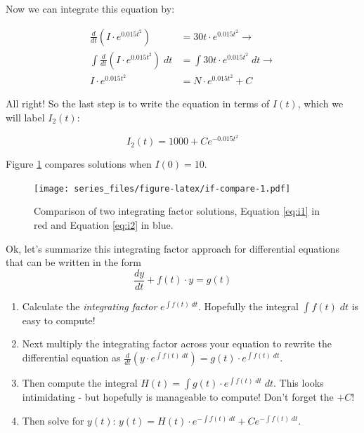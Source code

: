 \documentclass[
]{book}
\providecommand{\tightlist}{%
  \setlength{\itemsep}{0pt}\setlength{\parskip}{0pt}}
\theoremstyle{definition}
\theoremstyle{definition}
\theoremstyle{definition}
\theoremstyle{remark}
\begin{document}
Now we can integrate this equation by:

\begin{equation}
\begin{split}
\frac{d}{dt} \left( I \cdot e^{0.015 t^{2}} \right) &= 30 t \cdot e^{0.015 t^{2}}  \rightarrow \\
\int \frac{d}{dt} \left( I \cdot e^{0.015  t^{2}} \right) \; dt &= \int 30t \cdot e^{0.015 t^{2}}  \; dt \rightarrow \\
I \cdot e^{0.015 t^{2}} &= N \cdot e^{0.015 t^{2}} + C
\end{split}
\end{equation}

All right! So the last step is to write the equation in terms of \(I(t)\), which we will label \(I_{2}(t)\):

\begin{equation}
I_{2}(t) =  1000 + C e^{-0.015 t^{2}}  \label{eq:i2}
\end{equation}

Figure \ref{fig:if-compare} compares solutions when \(I(0)=10\).

\begin{figure}
\centering
\texttt{[image: series\_files/figure-latex/if-compare-1.pdf]}
\caption{\label{fig:if-compare}Comparison of two integrating factor solutions, Equation \eqref{eq:i1} in red and Equation \eqref{eq:i2} in blue.}
\end{figure}

Ok, let's summarize this integrating factor approach for differential equations that can be written in the form \[\frac{dy}{dt} + f(t) \cdot y = g(t)\]

\begin{enumerate}
\def\labelenumi{\arabic{enumi}.}
\tightlist
\item
  Calculate the \emph{integrating factor} \(\displaystyle e^{\int f(t) \; dt}\). Hopefully the integral \(\displaystyle \int f(t) \; dt\) is easy to compute!
\item
  Next multiply the integrating factor across your equation to rewrite the differential equation as \(\displaystyle \frac{d}{dt} \left( y \cdot e^{\int f(t) \; dt} \right) = g(t) \cdot e^{\int f(t) \; dt}\).
\item
  Then compute the integral \(\displaystyle H(t) = \int g(t) \cdot e^{\int f(t) \; dt} \; dt\). This looks intimidating - but hopefully is manageable to compute! Don't forget the \(+C\)!
\item
  Then solve for \(y(t)\): \(\displaystyle y(t) = H(t) \cdot e^{-\int f(t) \; dt} + C e^{-\int f(t) \; dt}\).
\end{enumerate}
\end{document}
